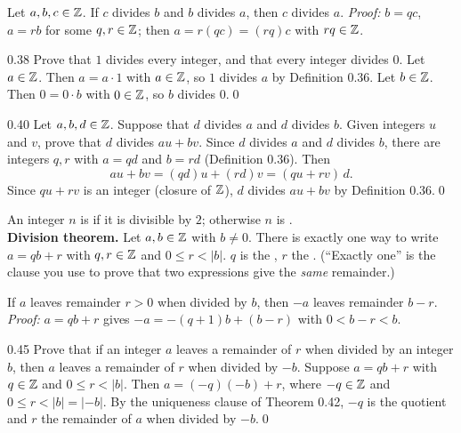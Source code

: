 \begin{result}[{Proposition 0.39}]
Let $a,b,c\in\mathbb{Z}$. If $c$ divides $b$ and $b$ divides $a$, then $c$ divides $a$. \emph{Proof:} $b=qc$, $a=rb$ for some $q,r\in\mathbb{Z}$; then $a=r(qc)=(rq)c$ with $rq\in\mathbb{Z}$.
\end{result}

\begin{bookex}[recommended]{0.38}
Prove that $1$ divides every integer, and that every integer divides $0$.
\solution
Let $a\in\mathbb{Z}$. Then $a=a\cdot1$ with $a\in\mathbb{Z}$, so $1$ divides $a$ by Definition 0.36. Let $b\in\mathbb{Z}$. Then $0=0\cdot b$ with $0\in\mathbb{Z}$, so $b$ divides $0$.\qed
\end{bookex}

\begin{bookex}[essential]{0.40}
Let $a,b,d\in\mathbb{Z}$. Suppose that $d$ divides $a$ and $d$ divides $b$. Given integers $u$ and $v$, prove that $d$ divides $au+bv$.
\solution
Since $d$ divides $a$ and $d$ divides $b$, there are integers $q,r$ with $a=qd$ and $b=rd$ (Definition 0.36). Then
\[
au+bv=(qd)u+(rd)v=(qu+rv)\,d .
\]
Since $qu+rv$ is an integer (closure of $\mathbb{Z}$), $d$ divides $au+bv$ by Definition 0.36.\qed
\end{bookex}

\begin{key}
An integer $n$ is  if it is divisible by $2$; otherwise $n$ is .\\
\textbf{Division theorem.} Let $a,b\in\mathbb{Z}$ with $b\ne0$. There is exactly one way to write $a=qb+r$ with $q,r\in\mathbb{Z}$ and $0\le r<|b|$. $q$ is the , $r$ the . (``Exactly one'' is the clause you use to prove that two expressions give the \emph{same} remainder.)
\end{key}

\begin{result}[{Proposition 0.44}]
If $a$ leaves remainder $r>0$ when divided by $b$, then $-a$ leaves remainder $b-r$. \emph{Proof:} $a=qb+r$ gives $-a=-(q+1)b+(b-r)$ with $0<b-r<b$.
\end{result}

\begin{bookex}[recommended]{0.45}
Prove that if an integer $a$ leaves a remainder of $r$ when divided by an integer $b$, then $a$ leaves a remainder of $r$ when divided by $-b$.
\solution
Suppose $a=qb+r$ with $q\in\mathbb{Z}$ and $0\le r<|b|$. Then $a=(-q)(-b)+r$, where $-q\in\mathbb{Z}$ and $0\le r<|b|=|-b|$. By the uniqueness clause of Theorem 0.42, $-q$ is the quotient and $r$ the remainder of $a$ when divided by $-b$.\qed
\end{bookex}

